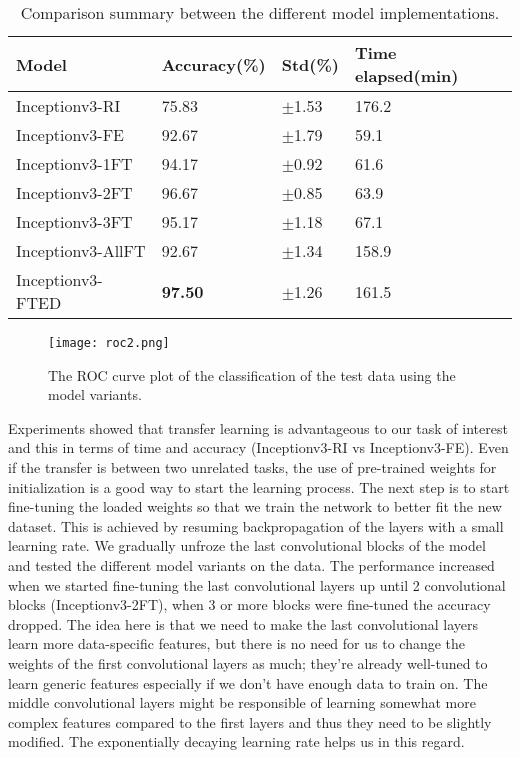 \documentclass{article}
\begin{document}
\begin{table}[h]
  \caption{Comparison summary between the different model implementations.}
  \label{res}
  \centering
  \begin{tabular}{llll}
    \toprule          
    Model    & Accuracy(\%)   & Std(\%)  &Time elapsed(min) \\
    \midrule
    Inceptionv3-RI   	& 75.83 	& $\pm$1.53    &176.2 		\\
    Inceptionv3-FE   	& 92.67 	& $\pm$1.79    &59.1		\\
    Inceptionv3-1FT  	& 94.17 	& $\pm$0.92    &61.6		\\
    Inceptionv3-2FT  	& 96.67 	& $\pm$0.85    &63.9		\\
    Inceptionv3-3FT  	& 95.17 	& $\pm$1.18    &67.1		\\
    Inceptionv3-AllFT   & 92.67	& $\pm$1.34    &158.9		\\
    Inceptionv3-FTED    & \textbf{97.50}	& $\pm$1.26   &161.5		\\
    \bottomrule
  \end{tabular}
\end{table}

\begin{figure}
  \centering
  \texttt{[image: roc2.png]}
  \caption{The ROC curve plot of the classification of the test data using the model variants.}
  \label{fig:roc}
\end{figure}
Experiments showed that transfer learning is advantageous to our task of interest and this in terms of time and accuracy (Inceptionv3-RI vs Inceptionv3-FE). Even if the transfer is between two unrelated tasks, the use of pre-trained weights for initialization is a good way to start the learning process. The next step is to start fine-tuning the loaded weights so that we train the network to better fit the new dataset. This is achieved by resuming backpropagation of the layers with a small learning rate. We gradually unfroze the last convolutional blocks of the model and tested the different model variants on the data. The performance increased when we started fine-tuning the last convolutional layers up until 2 convolutional blocks (Inceptionv3-2FT), when 3 or more blocks were fine-tuned the accuracy dropped. The idea here is that we need to make the last convolutional layers learn more data-specific features, but there is no need for us to change the weights of the first convolutional layers as much; they're already well-tuned to learn generic features especially if we don't have enough data to train on. The middle convolutional layers might be responsible of learning somewhat more complex features compared to the first layers and thus they need to be slightly modified. The exponentially decaying learning rate helps us in this regard.
\end{document}

